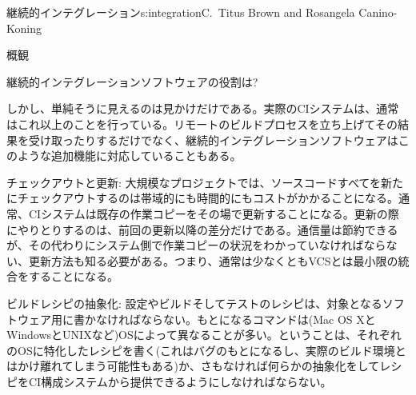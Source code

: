 \begin{aosachapter}{継続的インテグレーション}{s:integration}{C.\ Titus Brown and Rosangela Canino-Koning}
\begin{aosasect1}{概観}
\begin{aosasect2}{継続的インテグレーションソフトウェアの役割は?}

しかし、単純そうに見えるのは見かけだけである。実際のCIシステムは、通常はこれ以上のことを行っている。リモートのビルドプロセスを立ち上げてその結果を受け取ったりするだけでなく、継続的インテグレーションソフトウェアはこのような追加機能に対応していることもある。

\begin{aosadescription}

  \item{チェックアウトと更新:} 大規模なプロジェクトでは、ソースコードすべてを新たにチェックアウトするのは帯域的にも時間的にもコストがかかることになる。通常、CIシステムは既存の作業コピーをその場で更新することになる。更新の際にやりとりするのは、前回の更新以降の差分だけである。通信量は節約できるが、その代わりにシステム側で作業コピーの状況をわかっていなければならない、更新方法も知る必要がある。つまり、通常は少なくともVCSとは最小限の統合をすることになる。

  \item{ビルドレシピの抽象化:} 設定やビルドそしてテストのレシピは、対象となるソフトウェア用に書かなければならない。もとになるコマンドは(Mac OS XとWindowsとUNIXなど)OSによって異なることが多い。ということは、それぞれのOSに特化したレシピを書く(これはバグのもとになるし、実際のビルド環境とはかけ離れてしまう可能性もある)か、さもなければ何らかの抽象化をしてレシピをCI構成システムから提供できるようにしなければならない。


\end{aosadescription}
\end{aosasect2}
\end{aosasect1}
\end{aosachapter}
